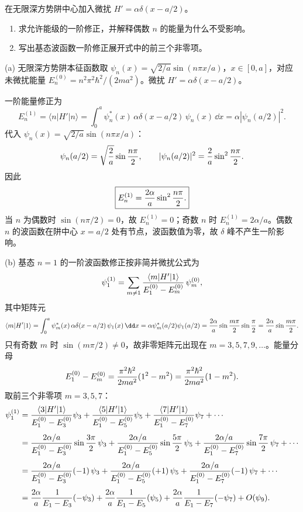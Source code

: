 \begin{question}
在无限深方势阱中心加入微扰 $H'=\alpha\delta(x-a/2)$。
\begin{enumerate}
\item 求允许能级的一阶修正，并解释偶数 $n$ 的能量为什么不受影响。
\item 写出基态波函数一阶修正展开式中的前三个非零项。
\end{enumerate}
\end{question}
\begin{solution}
(a) 无限深方势阱本征函数取 $\psi_n(x)=\sqrt{2/a}\sin(n\pi x/a)$，$x\in[0,a]$，对应未微扰能量 $E_n^{(0)}=n^2\pi^2\hbar^2/(2ma^2)$。微扰 $H'=\alpha\delta(x-a/2)$。

一阶能量修正为
\[
E_n^{(1)}=\langle n|H'|n\rangle=\int_0^a \psi_n^*(x)\,\alpha\delta(x-a/2)\,\psi_n(x)\,\dd x
=\alpha|\psi_n(a/2)|^2.
\]
代入 $\psi_n(x)=\sqrt{2/a}\sin(n\pi x/a)$：
\[
\psi_n(a/2)=\sqrt{2\over a}\sin{n\pi\over2},\qquad
|\psi_n(a/2)|^2={2\over a}\sin^2{n\pi\over2}.
\]
因此
\[
\boxed{E_n^{(1)}={2\alpha\over a}\sin^2{n\pi\over2}.}
\]
当 $n$ 为偶数时 $\sin(n\pi/2)=0$，故 $E_n^{(1)}=0$；奇数 $n$ 时 $E_n^{(1)}=2\alpha/a$。偶数 $n$ 的波函数在阱中心 $x=a/2$ 处有节点，波函数值为零，故 $\delta$ 峰不产生一阶影响。

(b) 基态 $n=1$ 的一阶波函数修正按非简并微扰公式为
\[
\psi_1^{(1)}=\sum_{m\ne1}{\langle m|H'|1\rangle\over E_1^{(0)}-E_m^{(0)}}\,\psi_m^{(0)},
\]
其中矩阵元
\[
\langle m|H'|1\rangle=\int_0^a\psi_m^*(x)\,\alpha\delta(x-a/2)\,\psi_1(x)\,\dd x
=\alpha\psi_m^*(a/2)\psi_1(a/2)
={2\alpha\over a}\sin{m\pi\over2}\sin{\pi\over2}
={2\alpha\over a}\sin{m\pi\over2}.
\]
只有奇数 $m$ 时 $\sin(m\pi/2)\ne0$，故非零矩阵元出现在 $m=3,5,7,9,\dots$。能量分母
\[
E_1^{(0)}-E_m^{(0)}={\pi^2\hbar^2\over2ma^2}(1^2-m^2)
={\pi^2\hbar^2\over2ma^2}(1-m^2).
\]
取前三个非零项 $m=3,5,7$：
\[
\begin{aligned}
\psi_1^{(1)}&=
{\langle3|H'|1\rangle\over E_1^{(0)}-E_3^{(0)}}\psi_3
+{\langle5|H'|1\rangle\over E_1^{(0)}-E_5^{(0)}}\psi_5
+{\langle7|H'|1\rangle\over E_1^{(0)}-E_7^{(0)}}\psi_7+\cdots\\[4pt]
&={2\alpha/a\over E_1^{(0)}-E_3^{(0)}}\sin{3\pi\over2}\,\psi_3
+{2\alpha/a\over E_1^{(0)}-E_5^{(0)}}\sin{5\pi\over2}\,\psi_5
+{2\alpha/a\over E_1^{(0)}-E_7^{(0)}}\sin{7\pi\over2}\,\psi_7+\cdots\\[4pt]
&={2\alpha/a\over E_1^{(0)}-E_3^{(0)}}(-1)\,\psi_3
+{2\alpha/a\over E_1^{(0)}-E_5^{(0)}}(+1)\,\psi_5
+{2\alpha/a\over E_1^{(0)}-E_7^{(0)}}(-1)\,\psi_7+\cdots\\[4pt]
&={2\alpha\over a}{1\over E_1-E_3}(-\psi_3)
+{2\alpha\over a}{1\over E_1-E_5}(\psi_5)
+{2\alpha\over a}{1\over E_1-E_7}(-\psi_7)+O(\psi_9).
\end{aligned}
\]
\end{solution}

